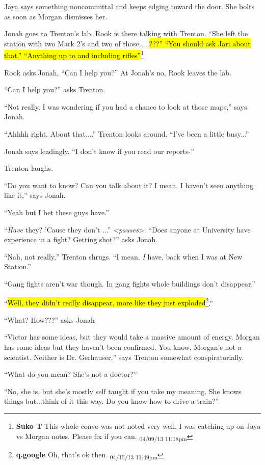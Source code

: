 Jaya says something noncommittal and keeps edging toward the door.  She bolts as soon as Morgan dismisses her.



Jonah goes to Trenton's lab.  Rook is there talking with Trenton.  ``She left the station with two Mark 2's and two of those.....\hl{???''  ``You should ask Jari about that.'' ``Anything up to and including rifles''}\footnote{\textbf{Suko T }This whole convo was not noted very well, I was catching up on Jaya vs Morgan notes.  Please fix if you can. \textsubscript{04/09/13 11:18pm}}  

Rook asks Jonah, ``Can I help you?''  At Jonah's no, Rook leaves the lab.

``Can I help you?'' asks Trenton.

``Not really.  I was wondering if you had a chance to look at those maps,'' says Jonah.

``Ahhhh right.  About that....'' Trenton looks around.  ``I've been a little busy...''

Jonah says leadingly, ``I don't know if you read our reports-''

Trenton laughs.  

``Do you want to know?  Can you talk about it?  I mean, I haven't seen anything like it,'' says Jonah.

``Yeah but I bet these guys have.''

``\textit{Have} they?  'Cause they don't ...'' \textit{\textless pauses}\textgreater .  ``Does anyone at University have experience in a fight?  Getting shot?'' asks Jonah.

``Nah, not really,'' Trenton shrugs.  ``I mean, \textit{I} have, back when I was at New Station.''

``Gang fights aren't war though.  In gang fights whole buildings don't disappear.''

``\hl{Well, they didn't really disappear, more like they just exploded}\footnote{\textbf{q.google }Oh, that's ok then. \textsubscript{04/15/13 11:49pm}}.''

``What?  How???'' asks Jonah

``Victor has some ideas, but they would take a massive amount of energy.  Morgan has some ideas but they haven't been confirmed.  You know, Morgan's not a scientist.  Neither is Dr. Gerhauser,'' says Trenton somewhat conspiratorially.

``What do you mean?  She's not a doctor?''

``No, she is, but she's mostly self taught if you take my meaning.  She knows things but...think of it this way.  Do you know how to drive a train?''

